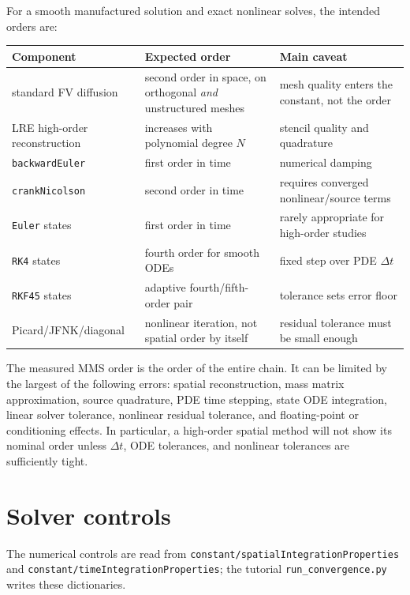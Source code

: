 \documentclass[11pt,a4paper]{article}
\newcommand{\code}[1]{\texttt{\small #1}}
\begin{document}
For a smooth manufactured solution and exact nonlinear solves, the intended
orders are:
\begin{center}
\scriptsize
\begin{tabular}{@{}lll@{}}
Component & Expected order & Main caveat \\
\midrule
standard FV diffusion & second order in space, on orthogonal \emph{and} unstructured meshes & mesh quality enters the constant, not the order \\
LRE high-order reconstruction & increases with polynomial degree $N$ & stencil quality and quadrature \\
\code{backwardEuler} & first order in time & numerical damping \\
\code{crankNicolson} & second order in time & requires converged nonlinear/source terms \\
\code{Euler} states & first order in time & rarely appropriate for high-order studies \\
\code{RK4} states & fourth order for smooth ODEs & fixed step over PDE $\Delta t$ \\
\code{RKF45} states & adaptive fourth/fifth-order pair & tolerance sets error floor \\
Picard/JFNK/diagonal & nonlinear iteration, not spatial order by itself & residual tolerance must be small enough \\
\bottomrule
\end{tabular}
\end{center}
The measured MMS order is the order of the entire chain. It can be limited by
the largest of the following errors: spatial reconstruction, mass matrix
approximation, source quadrature, PDE time stepping, state ODE integration,
linear solver tolerance, nonlinear residual tolerance, and floating-point or
conditioning effects. In particular, a high-order spatial method will not show
its nominal order unless $\Delta t$, ODE tolerances, and nonlinear tolerances
are sufficiently tight.

\section{Solver controls}
\label{sec:solver-controls}

The numerical controls are read from
\code{constant/spatialIntegrationProperties} and
\code{constant/timeIntegrationProperties}; the tutorial
\code{run\_convergence.py} writes these dictionaries.
\end{document}
